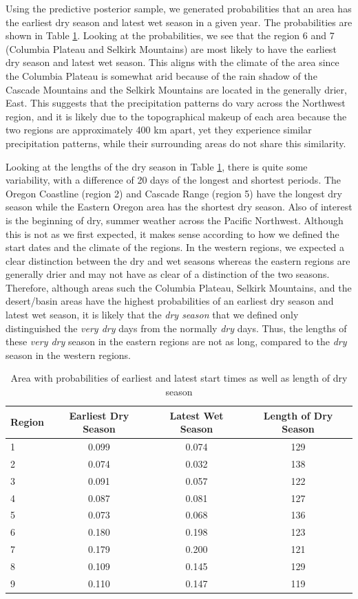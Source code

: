 \documentclass{article}
\begin{document}
Using the predictive posterior sample, we generated probabilities that an area has the earliest dry season and latest wet season in a given year. The probabilities are shown in Table \ref{lengthProb}. Looking at the probabilities, we see that the region 6 and 7 (Columbia Plateau and Selkirk Mountains) are most likely to have the earliest dry season and latest wet season. This aligns with the climate of the area since the Columbia Plateau is somewhat arid because of the rain shadow of the Cascade Mountains and the Selkirk Mountains are located in the generally drier, East. This suggests that the precipitation patterns do vary across the Northwest region, and it is likely due to the topographical makeup of each area because the two regions are approximately 400 km apart, yet they experience similar  precipitation patterns, while their surrounding areas do not share this similarity. 

Looking at the lengths of the dry season in Table \ref{lengthProb}, there is quite some variability, with a difference of 20 days of the longest and shortest periods.  The Oregon Coastline (region 2) and Cascade Range (region 5) have the longest dry season while the Eastern Oregon area has the shortest dry season. 
Also of interest is the beginning of dry, summer weather across the Pacific Northwest. Although this is not as we first expected, it makes sense according to how we defined the start dates and the climate of the regions. In the western regions, we expected a clear distinction between the dry and wet seasons whereas the eastern regions are generally drier and may not have as clear of a distinction of the two seasons. Therefore, although areas such the Columbia Plateau, Selkirk Mountains, and the desert/basin areas have the highest probabilities of an earliest dry season and latest wet season, it is likely that the \textit{dry season} that we defined only distinguished the \textit{very dry} days from the normally \textit{dry} days. Thus, the lengths of these \textit{very dry} season in the eastern regions are not as long, compared to the \textit{dry} season in the western regions. 

\begin{table}[h!]
\begin{tabular}{|l|c|c|c|}
\hline
Region & Earliest Dry Season & Latest Wet Season & Length of Dry Season\\
\hline
\hline
1&0.099&0.074&129 \\
2&0.074&0.032&138 \\
3&0.091&0.057&122 \\
4&0.087&0.081&127\\
5&0.073&0.068&136 \\
6&0.180&0.198&123\\
7&0.179&0.200&121\\
8&0.109&0.145&129\\
9&0.110&0.147&119\\
\hline
\end{tabular}
\caption{Area with probabilities of earliest and latest start times as well as length of dry season }
\label{lengthProb}
\end{table}
\end{document}
